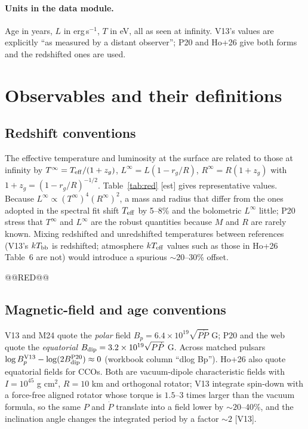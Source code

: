 \documentclass[11pt,a4paper]{article}
\newcommand{\src}[1]{\textsf{[#1]}}
\begin{document}
\paragraph{Units in the data module.} Age in years, $L$ in erg\,s$^{-1}$, $T$ in eV, all as seen at infinity. V13's values are explicitly ``as measured by a distant observer''; P20 and Ho+26 give both forms and the redshifted ones are used.

\section{Observables and their definitions}
\subsection{Redshift conventions}
The effective temperature and luminosity at the surface are related to those at infinity by $T^\infty=T_{\rm eff}/(1+z_g)$, $L^\infty=L(1-r_g/R)$, $R^\infty=R(1+z_g)$ with $1+z_g=(1-r_g/R)^{-1/2}$. Table~\ref{tab:red} \src{est} gives representative values. Because $L^\infty\propto (T^\infty)^4(R^\infty)^2$, a mass and radius that differ from the ones adopted in the spectral fit shift $T_{\rm eff}$ by 5--8\% and the bolometric $L^\infty$ little; P20 stress that $T^\infty$ and $L^\infty$ are the robust quantities because $M$ and $R$ are rarely known. Mixing redshifted and unredshifted temperatures between references (V13's $kT_{\rm bb}$ is redshifted; atmosphere $kT_{\rm eff}$ values such as those in Ho+26 Table~6 are not) would introduce a spurious $\sim20$--30\% offset.

@@RED@@

\subsection{Magnetic-field and age conventions}
V13 and M24 quote the \emph{polar} field $B_p=6.4\times10^{19}\sqrt{P\dot P}$ G; P20 and the web quote the \emph{equatorial} $B_{\rm dip}=3.2\times10^{19}\sqrt{P\dot P}$ G. Across matched pulsars $\log B_p^{\rm V13}-\log(2B_{\rm dip}^{\rm P20})\approx0$ (workbook column ``dlog Bp''). Ho+26 also quote equatorial fields for CCOs. Both are vacuum-dipole characteristic fields with $I=10^{45}$ g cm$^2$, $R=10$ km and orthogonal rotator; V13 integrate spin-down with a force-free aligned rotator whose torque is $1.5$--$3$ times larger than the vacuum formula, so the same $P$ and $\dot P$ translate into a field lower by $\sim20$--40\%, and the inclination angle changes the integrated period by a factor $\sim2$ \src{V13}.
\end{document}
